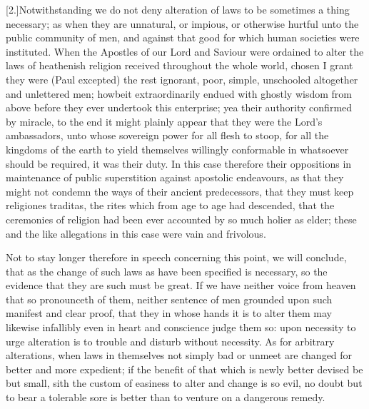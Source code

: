 [2.]Notwithstanding we do not deny alteration of laws to be sometimes a thing necessary; as when they are unnatural, or impious, or otherwise hurtful unto the public community of men, and against that good for which human societies were instituted. When the Apostles of our Lord and Saviour were ordained to alter the laws of heathenish religion received throughout the whole world, chosen I grant they were (Paul excepted) the rest ignorant, poor, simple, unschooled altogether and unlettered men; howbeit extraordinarily endued with ghostly wisdom from above before they ever undertook this enterprise; yea their authority confirmed by miracle, to  the end it might plainly appear that they were the Lord’s ambassadors, unto whose sovereign power for all flesh to stoop, for all the kingdoms of the earth to yield themselves willingly conformable in whatsoever should be required, it was their duty. In this case therefore their oppositions in maintenance of public superstition against apostolic endeavours, as that they might not condemn the ways of their ancient predecessors, that they must keep religiones traditas, the rites which from age to age had descended, that the ceremonies of religion had been ever accounted by so much holier as elder; these and the like allegations in this case were vain and frivolous.

Not to stay longer therefore in speech concerning this point, we will conclude, that as the change of such laws as have been specified is necessary, so the evidence that they are such must be great. If we have neither voice from heaven that so pronounceth of them, neither sentence of men grounded upon such manifest and clear proof, that they in whose hands it is to alter them may likewise infallibly even in heart and conscience judge them so: upon necessity to urge alteration is to trouble and disturb without necessity. As for arbitrary alterations, when laws in themselves not simply bad or unmeet are changed for better and more expedient; if the benefit of that which is newly better devised be but small, sith the custom of easiness to alter and change is so evil, no doubt but to bear a tolerable sore is better than to venture on a dangerous remedy.

